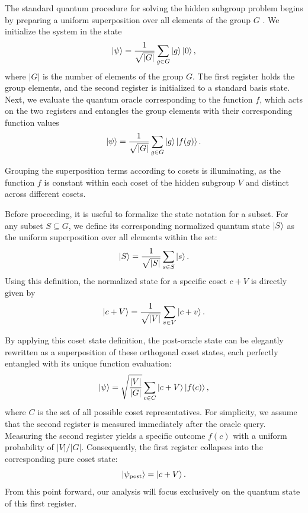 The standard quantum procedure for solving the hidden subgroup problem begins by preparing a uniform superposition over all elements of the group $G$ \cite{Kitaev1995,NielsenChuang2000}. We initialize the system in the state
\begin{equation}
    \ket{\psi} = \frac{1}{\sqrt{|G|}} \sum_{g \in G} \ket{g} \ket{0},
\end{equation}
where $|G|$ is the number of elements of the group $G$. The first register holds the group elements, and the second register is initialized to a standard basis state. Next, we evaluate the quantum oracle corresponding to the function $f$, which acts on the two registers and entangles the group elements with their corresponding function values
\begin{equation}
    \ket{\psi} = \frac{1}{\sqrt{|G|}} \sum_{g \in G} \ket{g} \ket{f(g)}.
\end{equation}


Grouping the superposition terms according to cosets is illuminating, as the function $f$ is constant within each coset of the hidden subgroup $V$ and distinct across different cosets.

Before proceeding, it is useful to formalize the state notation for a subset. For any subset $S \subseteq G$, we define its corresponding normalized quantum state $\ket{S}$ as the uniform superposition over all elements within the set:
\begin{equation}
    \ket{S} = \frac{1}{\sqrt{|S|}} \sum_{s \in S} \ket{s}.
\end{equation}
Using this definition, the normalized state for a specific coset $c+V$ is directly given by
\begin{equation}
    \ket{c+V} = \frac{1}{\sqrt{|V|}} \sum_{v \in V} \ket{c+v}.
\end{equation}

By applying this coset state definition, the post-oracle state can be elegantly rewritten as a superposition of these orthogonal coset states, each perfectly entangled with its unique function evaluation:
\begin{equation}
    \ket{\psi} = \sqrt{\frac{|V|}{|G|}} \sum_{c\in C} \ket{c+V} \ket{f(c)},
\end{equation}
where $C$ is the set of all possible coset representatives. For simplicity, we assume that the second register is measured immediately after the oracle query. Measuring the second register yields a specific outcome $f(c)$ with a uniform probability of $|V|/|G|$. Consequently, the first register collapses into the corresponding pure coset state:
\begin{equation}
    \ket{\psi_{\text{post}}} = \ket{c+V}.
\end{equation}
From this point forward, our analysis will focus exclusively on the quantum state of this first register.

